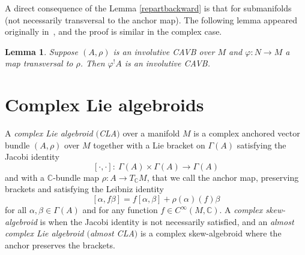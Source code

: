 \documentclass[pdftex]{sigma}
\numberwithin{equation}{section}
\newtheorem{Lemma}[Theorem]{Lemma}
\newcommand{\C}{{\mathbb{C}}}
\DeclareMathOperator{\real}{re}
\begin{document}
A direct consequence of the Lemma \ref{repartbackward} is that \smash{$\bigl(\iota^! A\bigr)^{\real}=\iota^! (A^{\real})$} for submanifolds  (not necessarily transversal to the anchor map).
The following lemma appeared originally in~\cite{bursztyn2019splitting}, and the proof is similar in the complex case.
\begin{Lemma}
   Suppose $(A,\rho)$ is an involutive CAVB over $M$ and $\varphi\colon N\to M$ a map transversal to $\rho$. Then $\varphi^! A$ is an involutive CAVB.
\end{Lemma}

 \section{Complex Lie algebroids}\label{CLA}
\begin{Definition}%
A {\em complex Lie algebroid $($CLA$)$} over a manifold $M$ is a complex anchored vector bundle $(A, \rho)$ over $M$ together with a Lie bracket on $\Gamma(A)$ satisfying the Jacobi identity
\[[\cdot,\cdot]\colon \ \Gamma(A)\times \Gamma(A)\to\Gamma(A)\]
 and with a $\C$-bundle map $\rho\colon A\to T_{\C}M$, that we call the anchor map, preserving brackets and satisfying the Leibniz identity
 \[[\alpha,f \beta]=f[\alpha,\beta]+\rho(\alpha)(f)\beta\]
 for all $\alpha,\beta\in \Gamma(A)$ and for any function $f\in C^{\infty}(M,\C)$. A {\em complex skew-algebroid} is when the Jacobi identity is not necessarily satisfied, and an {\em almost complex Lie algebroid $($almost CLA$)$} is a complex skew-algebroid where the anchor preserves the brackets.
\end{Definition}
\end{document}
